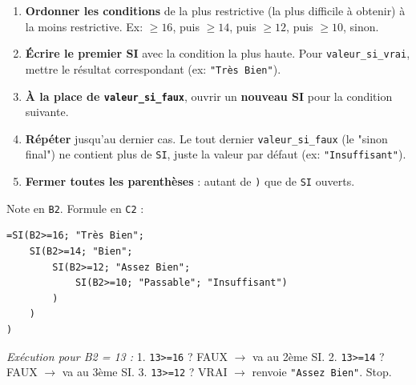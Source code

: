 \documentclass[11pt]{article}
\begin{document}
\begin{methode}
\begin{enumerate}
    \item \textbf{Ordonner les conditions} de la plus restrictive (la plus difficile à obtenir) à la moins restrictive. Ex: $\ge 16$, puis $\ge 14$, puis $\ge 12$, puis $\ge 10$, sinon.
    \item \textbf{Écrire le premier SI} avec la condition la plus haute. Pour \texttt{valeur\_si\_vrai}, mettre le résultat correspondant (ex: \texttt{"Très Bien"}).
    \item \textbf{À la place de \texttt{valeur\_si\_faux}}, ouvrir un \textbf{nouveau SI} pour la condition suivante.
    \item \textbf{Répéter} jusqu'au dernier cas. Le tout dernier \texttt{valeur\_si\_faux} (le "sinon final") ne contient plus de \texttt{SI}, juste la valeur par défaut (ex: \texttt{"Insuffisant"}).
    \item \textbf{Fermer toutes les parenthèses} : autant de \texttt{)} que de \texttt{SI} ouverts.
\end{enumerate}
\end{methode}

\begin{exemplebox}
Note en \texttt{B2}. Formule en \texttt{C2} :
\begin{lstlisting}
=SI(B2>=16; "Très Bien";
    SI(B2>=14; "Bien";
        SI(B2>=12; "Assez Bien";
            SI(B2>=10; "Passable"; "Insuffisant")
        )
    )
)
\end{lstlisting}
\emph{Exécution pour B2 = 13 :}
1. \texttt{13>=16} ? FAUX $\to$ va au 2ème SI.
2. \texttt{13>=14} ? FAUX $\to$ va au 3ème SI.
3. \texttt{13>=12} ? VRAI $\to$ renvoie \texttt{"Assez Bien"}. Stop.
\end{exemplebox}
\end{document}
